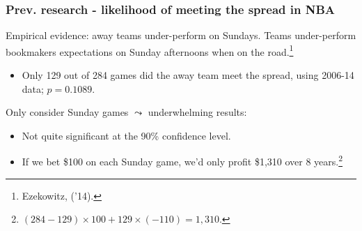 \documentclass{beamer}
\begin{document}
\begin{frame}   \frametitle{Prev. research - likelihood of meeting the spread in NBA}
  \begin{block}{Empirical evidence: away teams under-perform on Sundays.}
  Teams under-perform bookmakers expectations on Sunday afternoons when on the road.\footnote{Ezekowitz, ('14).}
    \begin{itemize}       
    \item Only 129 out of 284 games did the away team meet the spread, 
      using 2006-14 data; $p=0.1089$.
    \end{itemize}
    \vspace{12pt}
    \begin{block}{Only consider Sunday games $\leadsto$ underwhelming results:}       \begin{itemize}
          \item Not quite significant at the 90\% confidence level.     
          \item If we bet \$100 on each Sunday game, we'd only profit \$1,310 over 8 years.\footnote{$(284 - 129) \times 100 + 129 \times (-110) = 1,310$.} 
      \end{itemize}     \end{block}
  \end{block}
  \end{frame}










  
\end{document}
